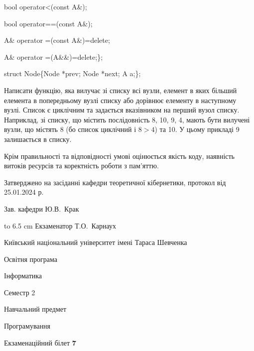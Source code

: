\documentclass[12pt, ukrainian]{article}
\begin{document}
{\quad  bool operator<(const A\&); 

\quad  bool operator==(const A\&); 

\quad A\& operator =(const A\&)=delete; 

\quad  A\& operator =(A\&\&)=delete;\};

struct Node\{Node *prev; Node *next; A a;\};

Написати функцію, яка вилучає зі списку всі вузли, елемент в яких більший елемента в попередньому вузлі списку або дорівнює елементу в наступному вузлі. Список є циклічним та задається вказівником на перший вузол списку. Наприклад, зі списку, що містить послідовність 8, 10, 9, 4, мають бути вилучені вузли, що містять 8 (бо список циклічний і $8>4$) та 10. У цьому прикладі 9 залишається в списку.

Крім правильності та відповідності умові оцінюється якість коду, наявність витоків ресурсів та коректність роботи з пам'яттю. 

}
{\smallskip\smallskip \begin {scriptsize} Затверджено на засіданні кафедри теоретичної кібернетики, протокол   від   25.01.2024 р.\par\smallskip\smallskip\smallskip\smallskip
{\parbox {6.5 cm} {Зав. кафедри \dotfill Ю.В.~Крак}}\hspace {0.7cm} {\hbox to 6.5 cm { Екзаменатор \dotfill Т.О.~Карнаух}} \end{scriptsize}}
\newpage
{{\begin {scriptsize}\par
{ \center  Київський національний університет імені Тараса Шевченка \par}
{\parbox {5 cm}{Освітня програма \hfill}{\parbox {7 cm}{Інформатика\hfill}}\parbox {6 cm}{\hfill Семестр 2}}\par
{\parbox {5 cm} {Навчальний предмет \hfill}\parbox {7 cm}{Програмування \hfill}\parbox {6cm}{\hfill}\par}\vspace{-15pt} \end{scriptsize}}{\center Екзаменаційний білет \No \textbf { 7 }\par}}
\end{document}
